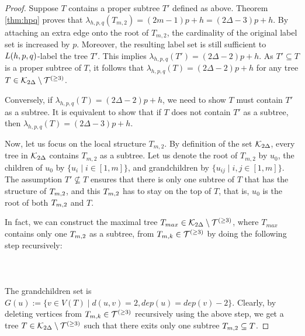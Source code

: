\begin{proof}
Suppose $T$ contains a proper subtree $T'$ defined as above. Theorem \ref{thm:hpq} proves that $\lambda_{h,p,q}(T_{m,2}) = (2m-1)p+h = (2\Delta-3)p+h$. By attaching an extra edge onto the root of $T_{m,2}$, the cardinality of the original label set is increased by $p$. Moreover, the resulting label set is still sufficient to $L(h,p,q)$-label the tree $T'$. This implies $\lambda_{h,p,q}(T') = (2\Delta-2)p+h$. As $T' \subseteq T$ is a proper subtree of $T$, it follows that $\lambda_{h,p,q}(T) = (2\Delta-2)p+h$ for any tree $T \in {\cal K}_{2\Delta} \setminus {\cal T}^{(\ge 3)}$. 

Conversely, if $\lambda_{h,p,q}(T) = (2\Delta-2)p+h$, we need to show $T$ must contain $T'$ as a subtree. It is equivalent to show that if $T$ does not contain $T'$ as a subtree, then $\lambda_{h,p,q}(T) = (2\Delta-3)p+h$. 

Now, let us focus on the local structure $T_{m,2}$. By definition of the set ${\cal K}_{2\Delta}$, every tree in ${\cal K}_{2\Delta}$ contains $T_{m,2}$ as a subtree. Let us denote the root of $T_{m,2}$ by $u_0$, the children of $u_0$ by $\{u_i \mid i \in [1,m]\}$, and grandchildren by $\{u_{ij} \mid i, j \in [1,m]\}$. The assumption $T' \not\subseteq T$ ensures that there is only one subtree of $T$ that has the structure of $\tm2$, and this $\tm2$ has to stay on the top of $T$, that is, $u_0$ is the root of both $\tm2$ and $T$. 

In fact, we can construct the maximal tree $T_{max} \in  {\cal K}_{2\Delta} \setminus {\cal T}^{(\ge 3)}$, where $T_{max}$ contains only one $\tm2$ as a subtree, from $T_{m,k} \in {\cal T}^{(\ge 3)}$ by doing the following step recursively: 
\\
\\
\\
\\
The grandchildren set is $G(u):=\{v \in V(T) \mid d(u,v) = 2, dep(u) = dep(v) -2\}$. Clearly, by deleting vertices from $T_{m,k} \in {\cal T}^{(\ge 3)}$ recursively using the above step, we get a tree $T \in {\cal K}_{2\Delta} \setminus {\cal T}^{(\ge 3)}$ such that there exits only one subtree $\tm2 \subseteq T$. 


\end{proof}
